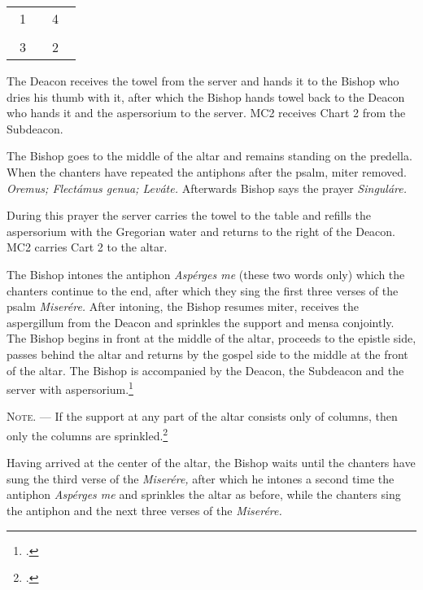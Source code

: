 \documentclass[letterpaper]{report}
\newcommand\crossplan{
\begin{center}
    \begin{tabular}{ | l c r | }
       \hline
        \cross\ {\tiny 1} &         & {\tiny 4} \cross\ \\
                           & \cross &           \\
        \cross\ {\tiny 3} &         & {\tiny 2} \cross\ \\
       \hline
   \end{tabular} 
\end{center}
}
\begin{document}
{    \crossplan

    The Deacon receives the towel from the server and hands it to the Bishop who
    dries his thumb with it, after which the Bishop hands towel back to the Deacon
    who hands it and the aspersorium to the server. MC2 receives Chart 2 from
    the Subdeacon.

    \rubric The Bishop goes to the middle of the altar and remains standing on the
    predella. When the chanters have repeated the antiphons after the psalm, miter
    removed. \textit{Oremus; Flectámus genua; Leváte.} Afterwards Bishop says the
    prayer \textit{Singuláre.}

    During this prayer the server carries the towel to the table and refills the
    aspersorium with the Gregorian water and returns to the right of the Deacon.
    MC2 carries Cart 2 to the altar.

    \rubric The Bishop intones the antiphon \textit{Asp\'erges me} (these two
    words only) which the chanters continue to the end, after which they sing
    the first three verses of the psalm \textit{Miser\'ere.} After intoning,
    the Bishop resumes miter, receives the aspergillum from the Deacon and
    sprinkles the support and mensa conjointly. The Bishop begins in front at
    the middle of the altar, proceeds to the epistle side, passes behind the
    altar and returns by the gospel side to the middle at the front of the
    altar. The Bishop is accompanied by the Deacon, the Subdeacon and the
    server with aspersorium.\footcite[If the back part of the altar is attached
    to the wall, so that the Bishop cannot go around it, he sprinkles only the
    \textit{base} of the altar when passing from the middle to the epistle
    corner, then the epistle side of the altar, afterwards the table of the
    altar from the epistle corner to the gospel corner, then the gospel side of
    the altar and finally the \textit{base} in front of the altar from the
    gospel corner to the middle.][footnote, p. 68.]{consecranda}

    \textsc{Note. ---} If the support at any part of the altar consists only of
    columns, then only the columns are sprinkled.\footcite[][p. 68.]{consecranda}

    \rubric Having arrived at the center of the altar, the Bishop waits until the
    chanters have sung the third verse of the \textit{Miser\'ere,} after which he
    intones a second time the antiphon \textit{Asp\'erges me} and sprinkles the altar
    as before, while the chanters sing the antiphon and the next three verses of
    the \textit{Miser\'ere.}

}
\end{document}
